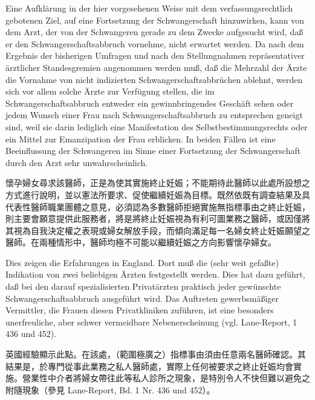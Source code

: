 \documentclass[12pt]{article}
\begin{document}
\syncleft
\begin{sourcepara}
Eine Aufklärung in der hier vorgesehenen Weise mit dem verfassungsrechtlich gebotenen Ziel, auf eine Fortsetzung der Schwangerschaft hinzuwirken, kann von dem Arzt, der von der Schwangeren gerade zu dem Zwecke aufgesucht wird, daß er den Schwangerschaftsabbruch vornehme, nicht erwartet werden. Da nach dem Ergebnis der bisherigen Umfragen und nach den Stellungnahmen repräsentativer ärztlicher Standesgremien angenommen werden muß, daß die Mehrzahl der Ärzte die Vornahme von nicht indizierten Schwangerschaftsabbrüchen ablehnt, werden sich vor allem solche Ärzte zur Verfügung stellen, die im Schwangerschaftsabbruch entweder ein gewinnbringendes Geschäft sehen oder jedem Wunsch einer Frau nach Schwangerschaftsabbruch zu entsprechen geneigt sind, weil sie darin lediglich eine Manifestation des Selbstbestimmungsrechts oder ein Mittel zur Emanzipation der Frau erblicken. In beiden Fällen ist eine Beeinflussung der Schwangeren im Sinne einer Fortsetzung der Schwangerschaft durch den Arzt sehr unwahrscheinlich.
\end{sourcepara}
\begin{transpara}
懷孕婦女尋求該醫師，正是為使其實施終止妊娠；不能期待此醫師以此處所設想之方式進行說明，並以憲法所要求、促使繼續妊娠為目標。既然依既有調查結果及具代表性醫師職業團體之意見，必須認為多數醫師拒絕實施無指標事由之終止妊娠，則主要會願意提供此服務者，將是將終止妊娠視為有利可圖業務之醫師，或因僅將其視為自我決定權之表現或婦女解放手段，而傾向滿足每一名婦女終止妊娠願望之醫師。在兩種情形中，醫師均極不可能以繼續妊娠之方向影響懷孕婦女。
\end{transpara}

\syncleft
\begin{sourcepara}
Dies zeigen die Erfahrungen in England. Dort muß die (sehr weit gefaßte) Indikation von zwei beliebigen Ärzten festgestellt werden. Dies hat dazu geführt, daß bei den darauf spezialisierten Privatärzten praktisch jeder gewünschte Schwangerschaftsabbruch ausgeführt wird. Das Auftreten gewerbsmäßiger Vermittler, die Frauen diesen Privatkliniken zuführen, ist eine besonders unerfreuliche, aber schwer vermeidbare Nebenerscheinung (vgl. Lane-Report, \abbrBd{} 1 \abbrNr{} 436 und 452).
\end{sourcepara}
\begin{transpara}
英國經驗顯示此點。在該處，（範圍極廣之）指標事由須由任意兩名醫師確認。其結果是，於專門從事此業務之私人醫師處，實際上任何被要求之終止妊娠均會實施。營業性中介者將婦女帶往此等私人診所之現象，是特別令人不快但難以避免之附隨現象（參見 Lane-Report, Bd. 1 Nr. 436 und 452）。
\end{transpara}
\end{document}
